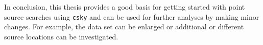 In conclusion, this thesis provides a good basis for getting started with point source searches using \texttt{csky} and can be used for further analyses by making minor changes.
For example, the data set can be enlarged or additional or different source locations can be investigated.



